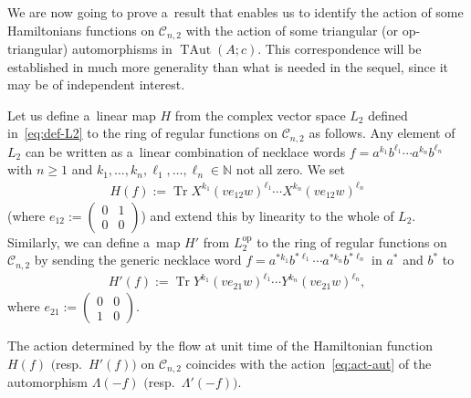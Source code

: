 \documentclass[pdftex]{sigma}
\newcommand{\bb}[1]{\mathbb{#1}}
\newcommand{\smm}[1]{\left(\begin{smallmatrix} #1\end{smallmatrix}\right)}
\DeclareMathOperator{\tr}{Tr}
\DeclareMathOperator{\TAut}{TAut}
\begin{document}
We are now going to prove a~result that enables us to identify the action of some Hamiltonians functions on
\(\mathcal{C}_{n,2}\) with the action of some triangular (or op-triangular) automorphisms in \(\TAut(A;c)\).
This correspondence will be established in much more generality than what is needed in the sequel, since it
may be of independent interest.

Let us def\/ine a~linear map \(H\) from the complex vector space \(L_{2}\) def\/ined in~\eqref{eq:def-L2}
to the ring of regular functions on \(\mathcal{C}_{n,2}\) as follows.
Any element of \(L_{2}\) can be written as a~linear combination of necklace words \(f =
a^{k_{1}}b^{\ell_{1}}\cdots a^{k_{n}}b^{\ell_{n}}\) with \(n\geq 1\) and \(k_{1}, \dots, k_{n}, \ell_{1},
\dots, \ell_{n}\in \bb{N}\) not all zero.
We set
\begin{gather}
\label{eq:def-H}
H(f)\mathrel{:=}\tr X^{k_{1}}(ve_{12}w)^{\ell_{1}}\cdots X^{k_{n}}(ve_{12}w)^{\ell_{n}}
\end{gather}
(where \(e_{12}\mathrel{:=} \smm{0 & 1
\\ %
0 & 0}\)) and extend this by linearity to the whole of \(L_{2}\).
Similarly, we can def\/ine a~map \(H'\) from \(L_{2}^{\mathrm{op}}\) to the ring of regular functions on
\(\mathcal{C}_{n,2}\) by sending the generic necklace word \(f = a^{*k_{1}}b^{*\ell_{1}}\cdots
a^{*k_{n}}b^{*\ell_{n}}\) in \(a^{*}\) and \(b^{*}\) to
\begin{gather}
\label{eq:def-Hp}
H'(f)\mathrel{:=}\tr Y^{k_{1}}(ve_{21}w)^{\ell_{1}}\cdots Y^{k_{n}}(ve_{21}w)^{\ell_{n}},
\end{gather}
where \(e_{21}\mathrel{:=} \smm{0 & 0
\\
1 & 0}\).

\begin{theorem}
\label{teo:flows}
The action determined by the flow at unit time of the Hamiltonian function \(H(f)\) $($resp.\
\(H'(f))\) on \(\mathcal{C}_{n,2}\) coincides with the action~\eqref{eq:act-aut} of the automorphism
\(\Lambda(-f)\) $($resp.\
\(\Lambda'(-f))\).
\end{theorem}
\end{document}
